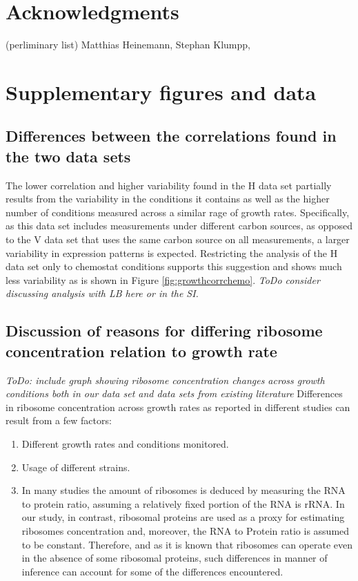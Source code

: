 \documentclass[notitlepage]{article}
\begin{document}
\section{Acknowledgments}
(perliminary list) Matthias Heinemann, Stephan Klumpp, 
\section{Supplementary figures and data}
\subsection{Differences between the correlations found in the two data sets}
\label{heinemannchemo}
The lower correlation and higher variability found in the H data set partially results from the variability in the conditions it contains as well as the higher number of conditions measured across a similar rage of growth rates.
Specifically, as this data set includes measurements under different carbon sources, as opposed to the V data set that uses the same carbon source on all measurements, a larger variability in expression patterns is expected.
Restricting the analysis of the H data set only to chemostat conditions supports this suggestion and shows much less variability as is shown in Figure \ref{fig:growthcorrchemo}.
\emph{ToDo consider discussing analysis with LB here or in the SI.}

\subsection{Discussion of reasons for differing ribosome concentration relation to growth rate}
\label{ribosomeconc}
\emph{ToDo: include graph showing ribosome concentration changes across growth conditions both in our data set and data sets from existing literature}
Differences in ribosome concentration  across growth rates as reported in different studies can result from a few factors:
\begin{enumerate}
\item Different growth rates and conditions monitored.
\item Usage of different strains.
\item In many studies the amount of ribosomes is deduced by measuring the RNA to protein ratio, assuming a relatively fixed portion of the RNA is rRNA.
In our study, in contrast, ribosomal proteins are used as a proxy for estimating ribosomes concentration and, moreover, the RNA to Protein ratio is assumed to be constant.
Therefore, and as it is known that ribosomes can operate even in the absence of some ribosomal proteins, such differences in manner of inference can account for some of the differences encountered.
\end{enumerate}
\end{document}
